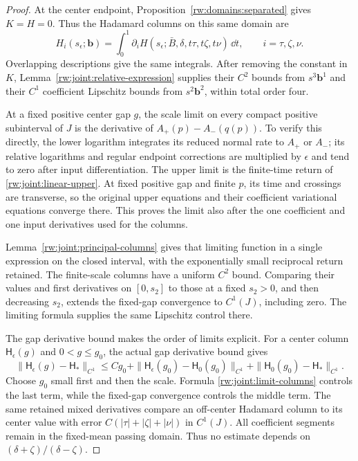 \begin{proof}
At the center endpoint, Proposition~\ref{rw:domains:separated}
gives $K=H=0$. Thus the Hadamard columns on this same domain are
\[
 H_i(s_\epsilon;\mathbf b)
   =\int_0^1\partial_iH
       (s_\epsilon;\bar B,\delta,t\tau,t\zeta,t\nu)\,\dd t,
 \qquad i=\tau,\zeta,\nu.
\]
Overlapping descriptions give the same integrals. After removing the
constant in $K$, Lemma~\ref{rw:joint:relative-expression} supplies
their $C^2$ bounds from $s^3\mathbf b^1$ and their $C^1$ coefficient
Lipschitz bounds from $s^2\mathbf b^2$, within total order four.

At a fixed positive center gap $g$, the scale limit on every compact
positive subinterval of $J$ is the derivative of
$A_+(p)-A_-(q(p))$. To verify this directly, the lower logarithm
integrates its reduced normal rate to $A_+$ or $A_-$; its relative
logarithms and regular endpoint corrections are multiplied by
$\epsilon$ and tend to zero after input differentiation.
The upper limit is the finite-time return of
\eqref{rw:joint:linear-upper}. At fixed positive gap and finite
$p$, its time and crossings are transverse, so the original upper
equations and their coefficient variational equations converge
there. This proves the limit also after the one coefficient and
one input derivatives used for the columns.

Lemma~\ref{rw:joint:principal-columns} gives that limiting
function in a single expression on the closed interval, with the
exponentially small reciprocal return retained. The finite-scale
columns have a uniform $C^2$ bound. Comparing their values and
first derivatives on $[0,s_2]$ to those at a fixed $s_2>0$,
and then decreasing $s_2$, extends the fixed-gap convergence to
$C^1(J)$, including zero. The limiting formula supplies the same
Lipschitz control there.

The gap derivative bound makes the order of limits explicit. For a center
column
$\mathsf H_\epsilon(g)$ and $0<g\le g_0$, the actual gap
derivative bound gives
\[
 \|\mathsf H_\epsilon(g)-\mathsf H_*\|_{C^1}
 \le Cg_0+
 \|\mathsf H_\epsilon(g_0)-\mathsf H_0(g_0)\|_{C^1}
 +\|\mathsf H_0(g_0)-\mathsf H_*\|_{C^1}.
\]
Choose $g_0$ small first and then the scale. Formula
\eqref{rw:joint:limit-columns} controls the last term, while the
fixed-gap convergence controls the middle term. The same retained mixed
derivatives compare an off-center Hadamard column to its center value
with error
$C(|\tau|+|\zeta|+|\nu|)$ in $C^1(J)$.
All coefficient segments remain in the fixed-mean passing domain.
Thus no estimate depends on
$(\delta+\zeta)/(\delta-\zeta)$.
\end{proof}

